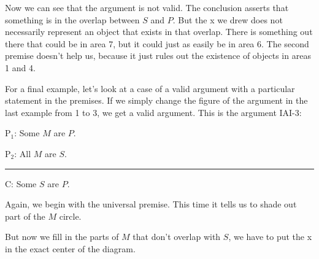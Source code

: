 Now we can see that the argument is not valid. The conclusion asserts that something is in the overlap between $S$ and $P$. But the x we drew does not necessarily represent an object that exists in that overlap. There is something out there that could be in area 7, but it could just as easily be in area 6. The second premise doesn't help us, because it just rules out the existence of objects in areas 1 and 4. 

For a final example, let's look at a case of a valid argument with a particular statement in the premises. If we simply change the figure of the argument in the last example from 1 to 3, we get a valid argument. This is the argument IAI-3:


\begin{earg}
\item[P$_1$:] Some $M$ are $P$.
\item[P$_2$:] All $M$ are $S$.
\vspace{-.5em}
\item [] \rule{0.3\linewidth}{.5pt} 
\item[C:] Some $S$ are $P$.
\end{earg} 

Again, we begin with the universal premise. This time it tells us to shade out part of the $M$ circle. 

\begin{center}
\end{center}

But now we fill in the parts of $M$ that don't overlap with $S$, we have to put the x in the exact center of the diagram.


\begin{center}
\end{center}



